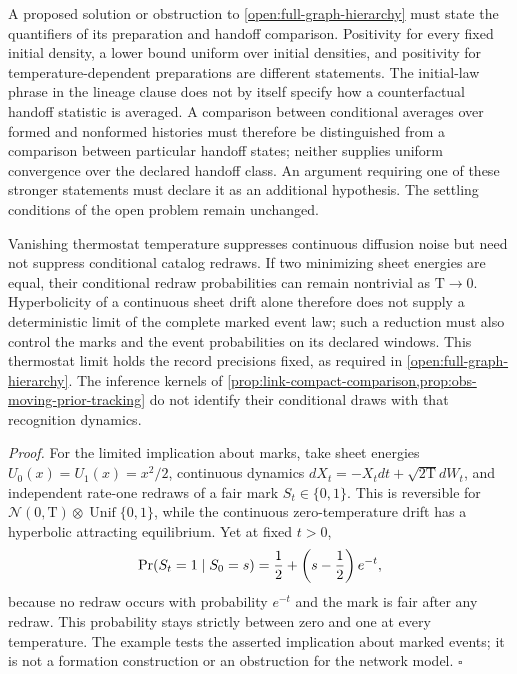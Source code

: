 A proposed solution or obstruction to \cref{open:full-graph-hierarchy} must
state the quantifiers of its preparation and handoff comparison. Positivity for
every fixed initial density, a lower bound uniform over initial densities, and
positivity for temperature-dependent preparations are different statements.
The initial-law phrase in the lineage clause does not by itself specify how a
counterfactual handoff statistic is averaged. A comparison between conditional
averages over formed and nonformed histories must therefore be distinguished
from a comparison between particular handoff states; neither supplies uniform
convergence over the declared handoff class. An argument requiring one of
these stronger statements must declare it as an additional hypothesis. The
settling conditions of the open problem remain unchanged.

Vanishing thermostat temperature suppresses continuous diffusion noise but
need not suppress conditional catalog redraws. If two minimizing sheet
energies are equal, their conditional redraw probabilities can remain
nontrivial as $\mathrm T\to0$. Hyperbolicity of a continuous sheet drift alone
therefore does not supply a deterministic limit of the complete marked event
law; such a reduction must also control the marks and the event probabilities
on its declared windows. This thermostat limit holds the record precisions
fixed, as required in \cref{open:full-graph-hierarchy}. The inference kernels of
\cref{prop:link-compact-comparison,prop:obs-moving-prior-tracking} do not identify
their conditional draws with that recognition dynamics.

\noindent\emph{Proof.}
For the limited implication about marks, take sheet energies
$U_0(x)=U_1(x)=x^2/2$, continuous dynamics
$dX_t=-X_tdt+\sqrt{2\mathrm T}dW_t$, and independent rate-one redraws of a
fair mark $S_t\in\{0,1\}$. This is reversible for
$\mathcal N(0,\mathrm T)\otimes\operatorname{Unif}\{0,1\}$, while the continuous
zero-temperature drift has a hyperbolic attracting equilibrium. Yet at fixed
$t>0$,
\begin{equation}
\Pr(S_t=1\mid S_0=s)=\frac12+\left(s-\frac12\right)e^{-t},
\end{equation}
because no redraw occurs with probability $e^{-t}$ and the mark is fair after
any redraw. This probability stays strictly between zero and one at every
temperature. The example tests the asserted implication about marked events;
it is not a formation construction or an obstruction for the network model.
$\square$

